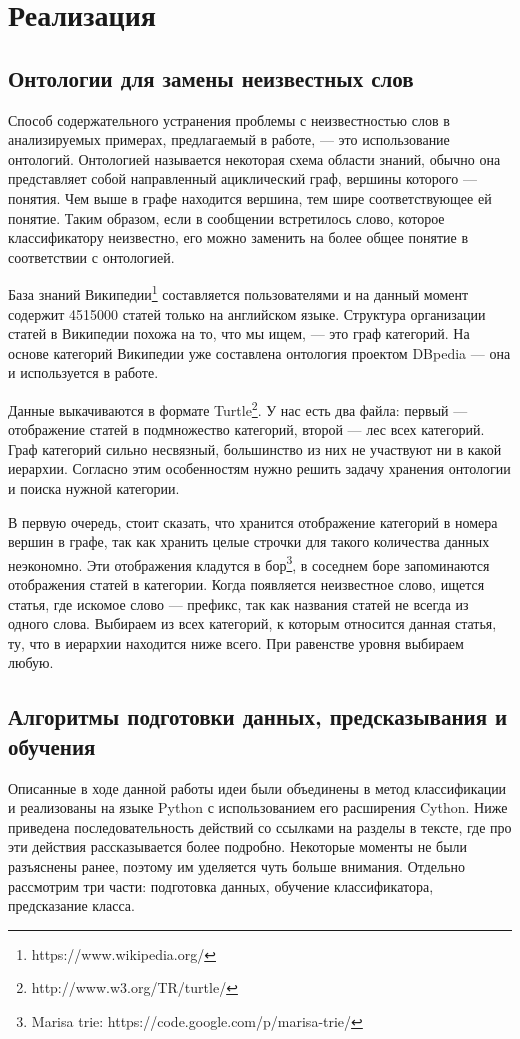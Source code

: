 \section{Реализация}
\subsection{Онтологии для замены неизвестных слов}\label{ontology}
Способ содержательного устранения проблемы с неизвестностью слов в анализируемых примерах,
предлагаемый в работе, --- это использование онтологий. Онтологией называется некоторая схема области
знаний, обычно она представляет собой направленный ациклический граф, вершины которого ---
понятия. Чем выше в графе находится вершина, тем шире соответствующее ей понятие. Таким образом,
если в сообщении встретилось слово, которое классификатору неизвестно, его можно заменить на более
общее понятие в соответствии с онтологией.

База знаний Википедии\footnote{https://www.wikipedia.org/} составляется пользователями и на данный
момент содержит 4515000 статей только на английском языке. Структура организации статей в
Википедии похожа на то, что мы ищем, --- это граф категорий.
На основе категорий Википедии уже составлена онтология проектом DBpedia\cite{dbpedia-swj} --- она и
используется в работе.

Данные выкачиваются в формате
Turtle\footnote{http://www.w3.org/TR/turtle/}. У нас есть два файла: первый --- отображение статей в
подмножество категорий, второй --- лес всех категорий. Граф категорий сильно несвязный, большинство
из них не участвуют ни в какой иерархии. Согласно этим особенностям нужно решить задачу хранения
онтологии и поиска нужной категории.

В первую очередь, стоит сказать, что хранится отображение категорий в номера вершин в графе, так как
хранить целые строчки для такого количества данных неэкономно. Эти отображения кладутся в
бор\footnote{Marisa trie: https://code.google.com/p/marisa-trie/}, в
соседнем боре запоминаются отображения статей в категории.
Когда появляется неизвестное слово, ищется статья, где искомое
слово --- префикс, так как названия статей не всегда из одного слова.
Выбираем из всех категорий, к которым относится данная статья, ту, что в иерархии находится ниже всего. При равенстве уровня выбираем любую.

\subsection{Алгоритмы подготовки данных, предсказывания и обучения}
Описанные в ходе данной работы идеи были объединены в метод классификации
и реализованы на языке Python с использованием его расширения Cython. Ниже
приведена последовательность действий со ссылками на разделы в тексте, где про эти действия
рассказывается более подробно. Некоторые моменты не были разъяснены ранее, поэтому им уделяется чуть
больше внимания. Отдельно рассмотрим три части: подготовка данных, обучение классификатора,
предсказание класса.

